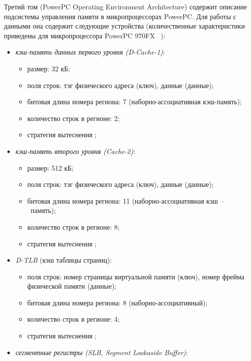 Третий том (PowerPC Operating Environment Architecture) содержит описание подсистемы управления памяти в микропроцессорах PowerPC. Для работы с данными она содержит следующие устройства (количественные характеристики приведены для микропроцессора PowerPC 970FX
~\cite{PowerPC970FXUserManual}):
\begin{itemize}
  \item \emph{кэш-память данных первого уровня (D-Cache-1)}:
        \begin{itemize}
            \item размер: 32 кБ;
            \item поля строк: тэг физического адреса (ключ), данные (данные);
            \item битовая длина номера региона: 7 (наборно-ассоциативная
кэш-память);
            \item количество строк в регионе: 2;
            \item стратегия вытеснения \LRU;
        \end{itemize}
  \item \emph{кэш-память второго уровня (Cache-2)}:
        \begin{itemize}
            \item размер: 512 кБ;
            \item поля строк: тэг физического адреса (ключ), данные (данные);
            \item битовая длина номера региона: 11 (наборно-ассоциативная кэш~--~память);
            \item количество строк в регионе: 8;
            \item стратегия вытеснения \LRU;
        \end{itemize}
  \item \emph{D-TLB} (кэш таблицы страниц):
        \begin{itemize}
            \item поля строк: номер страницы виртуальной памяти (ключ), номер
фрейма физической памяти (данные);
            \item битовая длина номера региона: 8 (наборно-ассоциативный);
            \item количество строк в регионе: 4;
            \item стратегия вытеснения \LRU;
        \end{itemize}
  \item \emph{сегментные регистры (SLB, Segment Lookaside Buffer)}:
        \begin{itemize}

\end{itemize}
\end{itemize}
